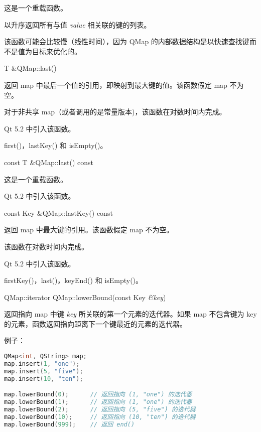 这是一个重载函数。

以升序返回所有与值 \emph{value} 相关联的键的列表。

该函数可能会比较慢（线性时间），因为 QMap 的内部数据结构是以快速查找键而不是值为目标来优化的。

\splitLine

T \&QMap::last()

返回 map 中最后一个值的引用，即映射到最大键的值。该函数假定 map 不为空。

对于非共享 map（或者调用的是常量版本)，该函数在对数时间内完成。

Qt 5.2 中引入该函数。

\begin{notice}[另请参阅]
first()，lastKey() 和 isEmpty()。
\end{notice}

\splitLine

const T \&QMap::last() const

这是一个重载函数。

Qt 5.2 中引入该函数。

\splitLine

const Key \&QMap::lastKey() const

返回 map 中最大键的引用。该函数假定 map 不为空。

该函数在对数时间内完成。

Qt 5.2 中引入该函数。

\begin{notice}[另请参阅]
firstKey()，last()，keyEnd() 和 isEmpty()。
\end{notice}

\splitLine

QMap::iterator QMap::lowerBound(const Key \emph{\&key})

返回指向 map 中键 \emph{key} 所关联的第一个元素的迭代器。如果 map 不包含键为 key 的元素，函数返回指向距离下一个键最近的元素的迭代器。

例子：

\begin{lstlisting}[language=C++]
QMap<int, QString> map;
map.insert(1, "one");
map.insert(5, "five");
map.insert(10, "ten");

map.lowerBound(0);      // 返回指向 (1, "one") 的迭代器
map.lowerBound(1);      // 返回指向 (1, "one") 的迭代器
map.lowerBound(2);      // 返回指向 (5, "five") 的迭代器
map.lowerBound(10);     // 返回指向 (10, "ten") 的迭代器
map.lowerBound(999);    // 返回 end()
\end{lstlisting}


